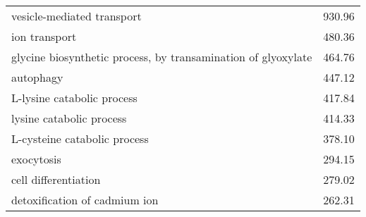 \begin{table}[hp]
\begin{center}
\begin{tabular}{p{}r}
vesicle-mediated transport                                    & 930.96                      \\
ion transport                                                 & 480.36                      \\
glycine biosynthetic process, by transamination of glyoxylate & 464.76                      \\
autophagy                                                     & 447.12                      \\
L-lysine catabolic process                                    & 417.84                      \\
lysine catabolic process                                      & 414.33                      \\
L-cysteine catabolic process                                  & 378.10                      \\
exocytosis                                                    & 294.15                      \\ %
cell differentiation                                          & 279.02                      \\ %
detoxification of cadmium ion                                 & 262.31                      \\

\end{tabular}
\end{center}
\end{table}
